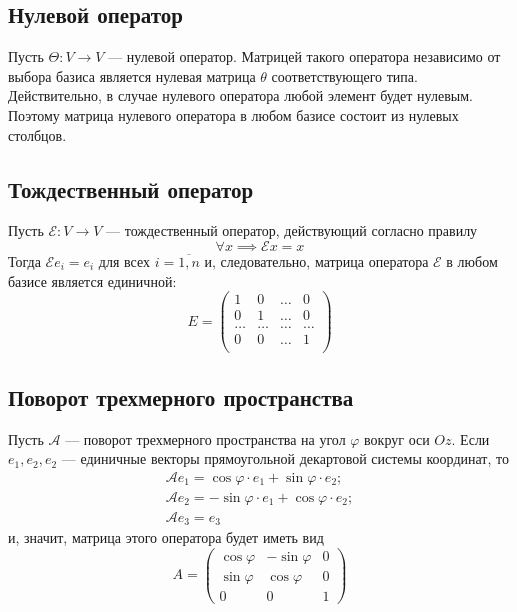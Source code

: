 \documentclass[a5paper, 11pt]{extbook}
\theoremstyle{definition}
\theoremstyle{definition}
\begin{document}
\subsection{Нулевой оператор}

Пусть \(\Theta : V \to V\) — нулевой оператор. Матрицей такого оператора независимо от выбора базиса является нулевая матрица \(\theta\) соответствующего типа. Действительно, в случае нулевого оператора любой элемент будет нулевым. Поэтому матрица нулевого оператора в любом базисе состоит из нулевых столбцов.

\subsection{Тождественный оператор}

Пусть \(\mathcal{E}: V \to V\) — тождественный оператор, действующий согласно правилу
\[
    \forall x \implies \mathcal{E} x = x
\]
Тогда \(\mathcal{E} e_i = e_i\) для всех \(i = \overline{1, n}\) и, следовательно, матрица оператора \(\mathcal{E}\) в любом базисе является единичной:
\[
    E =
    \begin{pmatrix}
        1      & 0      & \ldots & 0      \\
        0      & 1      & \ldots & 0      \\
        \ldots & \ldots & \ldots & \ldots \\
        0      & 0      & \ldots & 1      \\
    \end{pmatrix}
\]

\subsection{Поворот трехмерного пространства}

Пусть \(\mathcal{A}\) — поворот трехмерного пространства на угол \(\varphi\) вокруг оси \(Oz\). Если \(e_1, e_2, e_2\) — единичные векторы прямоугольной декартовой системы координат, то
\begin{gather*}
    \mathcal{A} e_1 = \cos \varphi \cdot e_1 + \sin \varphi \cdot e_2; \\
    \mathcal{A} e_2 = - \sin \varphi \cdot e_1 + \cos \varphi \cdot e_2; \\
    \mathcal{A} e_3 = e_3
\end{gather*}
и, значит, матрица этого оператора будет иметь вид
\[
    A =
    \begin{pmatrix}
        \cos \varphi & - \sin \varphi & 0 \\
        \sin \varphi & \cos \varphi   & 0 \\
        0            & 0              & 1
    \end{pmatrix}
\]
\end{document}
